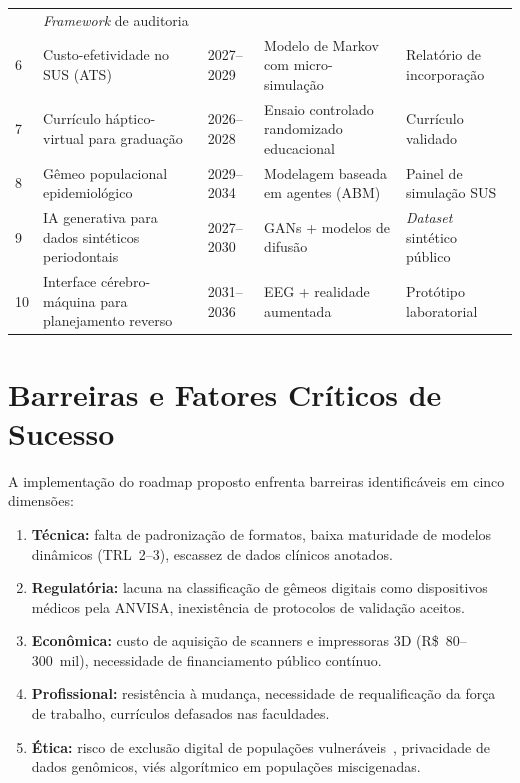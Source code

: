 \begin{longtable}{p{0.5cm}p{3.2cm}p{1.8cm}p{2.5cm}p{3.5cm}}
    & \textit{Framework} de auditoria \\
    6
    & Custo-efetividade no SUS (ATS)
    & 2027--2029
    & Modelo de Markov com micro-simulação
    & Relatório de incorporação \\
    7
    & Currículo háptico-virtual para graduação
    & 2026--2028
    & Ensaio controlado randomizado educacional
    & Currículo validado \\
    8
    & Gêmeo populacional epidemiológico
    & 2029--2034
    & Modelagem baseada em agentes (ABM)
    & Painel de simulação SUS \\
    9
    & IA generativa para dados sintéticos periodontais
    & 2027--2030
    & GANs + modelos de difusão
    & \textit{Dataset} sintético público \\
    10
    & Interface cérebro-máquina para planejamento reverso
    & 2031--2036
    & EEG + realidade aumentada
    & Protótipo laboratorial \\
\end{longtable}


\section{Barreiras e Fatores Críticos de Sucesso}

A implementação do roadmap proposto enfrenta barreiras
identificáveis em cinco dimensões:

\begin{enumerate}
    \item \textbf{Técnica:} falta de padronização de formatos,
        baixa maturidade de modelos dinâmicos (TRL~2--3),
        escassez de dados clínicos anotados.
    \item \textbf{Regulatória:} lacuna na classificação de gêmeos
        digitais como dispositivos médicos pela ANVISA,
        inexistência de protocolos de validação aceitos.
    \item \textbf{Econômica:} custo de aquisição de scanners e
        impressoras 3D (R\$~80--300~mil), necessidade de
        financiamento público contínuo.
    \item \textbf{Profissional:} resistência à mudança,
        necessidade de requalificação da força de trabalho,
        currículos defasados nas faculdades.
    \item \textbf{Ética:} risco de exclusão digital de
        populações vulneráveis~\cite{cuadros2023assessing},
        privacidade de dados genômicos,
        viés algorítmico em populações miscigenadas.
\end{enumerate}

